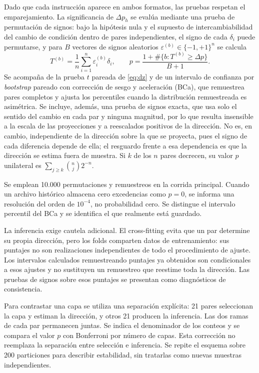 Dado que cada instrucción aparece en ambos formatos, las pruebas respetan el emparejamiento. La significancia de $\Delta p_h$ se evalúa mediante una prueba de permutación de signos: bajo la hipótesis nula y el supuesto de intercambiabilidad del cambio de condición dentro de pares independientes, el signo de cada $\delta_i$ puede permutarse, y para $B$ vectores de signos aleatorios $\varepsilon^{(b)} \in \{-1,+1\}^n$ se calcula
\begin{equation}
T^{(b)} = \frac{1}{n} \sum_{i=1}^{n} \varepsilon_i^{(b)} \delta_i,
\qquad
p = \frac{1 + \#\{ b : T^{(b)} \ge \Delta p \}}{B + 1}.
\end{equation}
Se acompaña de la prueba $t$ pareada de \eqref{eq:dz} y de un intervalo de confianza por \textit{bootstrap} pareado con corrección de sesgo y aceleración (BCa), que remuestrea pares completos y ajusta los percentiles cuando la distribución remuestreada es asimétrica. Se incluye, además, una prueba de signos exacta, que usa solo el sentido del cambio en cada par y ninguna magnitud, por lo que resulta insensible a la escala de las proyecciones y a reescalados positivos de la dirección. No es, en cambio, independiente de la dirección sobre la que se proyecta, pues el signo de cada diferencia depende de ella; el resguardo frente a esa dependencia es que la dirección se estima fuera de muestra. Si $k$ de los $n$ pares decrecen, su valor $p$ unilateral es $\sum_{j \ge k} \binom{n}{j} 2^{-n}$.

Se emplean 10.000 permutaciones y remuestreos en la corrida principal. Cuando un archivo histórico almacena cero excedencias como $p=0$, se informa una resolución del orden de $10^{-4}$, no probabilidad cero. Se distingue el intervalo percentil del BCa y se identifica el que realmente está guardado.

La inferencia exige cautela adicional. El cross-fitting evita que un par determine su propia dirección, pero los folds comparten datos de entrenamiento: sus puntajes no son realizaciones independientes de todo el procedimiento de ajuste. Los intervalos calculados remuestreando puntajes ya obtenidos son condicionales a esos ajustes y no sustituyen un remuestreo que reestime toda la dirección. Las pruebas de signos sobre esos puntajes se presentan como diagnósticos de consistencia.

Para contrastar una capa se utiliza una separación explícita: 21 pares seleccionan la capa y estiman la dirección, y otros 21 producen la inferencia. Las dos ramas de cada par permanecen juntas. Se indica el denominador de los conteos y se compara el valor $p$ con Bonferroni por número de capas. Esta corrección no reemplaza la separación entre selección e inferencia. Se repite el esquema sobre 200 particiones para describir estabilidad, sin tratarlas como nuevas muestras independientes.


